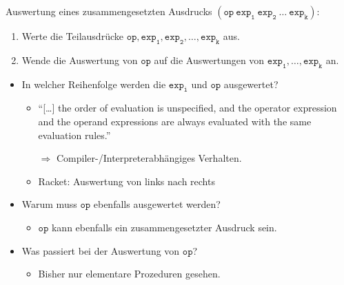 \begin{frame}[t,fragile]{}
	\begin{mybox}
		Auswertung eines zusammengesetzten Ausdrucks $\mathtt{(op \ exp_1 \ exp_2 \ \dots \ exp_k)}$:
		\begin{enumerate}[(1)]
			\item Werte die Teilausdrücke $\mathtt{op}, \mathtt{exp_1}, \mathtt{exp_2}, \dots, \mathtt{exp_k}$ aus.
			\item Wende die Auswertung von $\mathtt{op}$ auf die Auswertungen von $\mathtt{exp_1}, \dots, \mathtt{exp_k}$ an.
		\end{enumerate}
	\end{mybox} \pause
	
	\vspace*{0.5cm}
	
	\begin{itemize}
		\item In welcher Reihenfolge werden die $\mathtt{exp_i}$ und $\mathtt{op}$ ausgewertet? \pause
		\begin{itemize}
			\item \enquote{[\dots] the order of evaluation is unspecified, and the operator expression and the operand expressions are always evaluated with the same evaluation rules.} 
			\item[$\Rightarrow$] Compiler-/Interpreterabhängiges Verhalten.
			\item Racket: Auswertung von links nach rechts 
		\end{itemize}
		\item Warum muss $\mathtt{op}$ ebenfalls ausgewertet werden? \pause
		\begin{itemize}
			\item $\mathtt{op}$ kann ebenfalls ein zusammengesetzter Ausdruck sein.
		\end{itemize}
		\item Was passiert bei der Auswertung von $\mathtt{op}$?
		\begin{itemize}
			\item Bisher nur elementare  Prozeduren gesehen.
		\end{itemize}
	\end{itemize}
\end{frame}